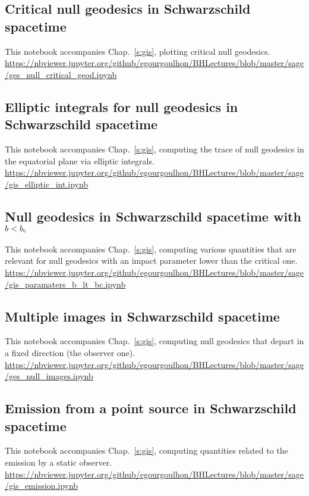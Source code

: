 \subsection{Critical null geodesics in Schwarzschild spacetime} \label{s:sam:ges_null_critical_geod}
%
This notebook accompanies Chap.~\ref{s:gis}, plotting critical null geodesics.\\[1ex]
{\footnotesize
\url{https://nbviewer.jupyter.org/github/egourgoulhon/BHLectures/blob/master/sage/ges_null_critical_geod.ipynb}
}

\subsection{Elliptic integrals for null geodesics in Schwarzschild spacetime} \label{s:sam:gis_elliptic_int}
%
This notebook accompanies Chap.~\ref{s:gis}, computing the trace of null
geodesics in the equatorial plane via elliptic integrals.\\[1ex]
{\footnotesize
\url{https://nbviewer.jupyter.org/github/egourgoulhon/BHLectures/blob/master/sage/gis_elliptic_int.ipynb}
}

\subsection{Null geodesics in Schwarzschild spacetime with $b<b_{\rm c}$} \label{s:sam:gis_paramaters_b_lt_bc}
%
This notebook accompanies Chap.~\ref{s:gis}, computing various quantities that
are relevant for null geodesics with an impact parameter lower than the critical one.\\[1ex]
{\footnotesize
\url{https://nbviewer.jupyter.org/github/egourgoulhon/BHLectures/blob/master/sage/gis_paramaters_b_lt_bc.ipynb}
}

\subsection{Multiple images in Schwarzschild spacetime} \label{s:sam:ges_null_images}
%
This notebook accompanies Chap.~\ref{s:gis}, computing null geodesics that
depart in a fixed direction (the observer one).\\[1ex]
{\footnotesize
\url{https://nbviewer.jupyter.org/github/egourgoulhon/BHLectures/blob/master/sage/ges_null_images.ipynb}
}

\subsection{Emission from a point source in Schwarzschild spacetime} \label{s:sam:gis_emission}
%
This notebook accompanies Chap.~\ref{s:gis}, computing quantities related to the
emission by a static observer.\\[1ex]
{\footnotesize
\url{https://nbviewer.jupyter.org/github/egourgoulhon/BHLectures/blob/master/sage/gis_emission.ipynb}
}

